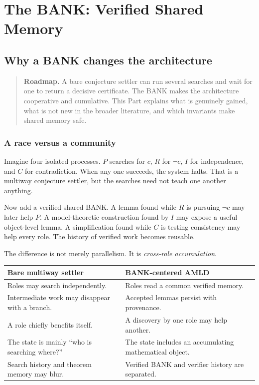 \documentclass[11pt,openany]{book}
\theoremstyle{definition}
\theoremstyle{remark}
\newenvironment{roadmap}{\begin{quote}\small\color{deepblue}\textbf{Roadmap.} }{\end{quote}}
\begin{document}
\part{The BANK: Verified Shared Memory}

\chapter{Why a BANK changes the architecture}
\begin{roadmap}
A bare conjecture settler can run several searches and wait for one to return a decisive certificate. The BANK makes the architecture cooperative and cumulative. This Part explains what is genuinely gained, what is not new in the broader literature, and which invariants make shared memory safe.
\end{roadmap}

\section{A race versus a community}
Imagine four isolated processes. $P$ searches for $c$, $R$ for $\neg c$, $I$ for independence, and $C$ for contradiction. When any one succeeds, the system halts. That is a multiway conjecture settler, but the searches need not teach one another anything.

Now add a verified shared BANK. A lemma found while $R$ is pursuing $\neg c$ may later help $P$. A model-theoretic construction found by $I$ may expose a useful object-level lemma. A simplification found while $C$ is testing consistency may help every role. The history of verified work becomes reusable.

The difference is not merely parallelism. It is \emph{cross-role accumulation}.

\begin{center}
\begin{tabular}{>{\raggedright\arraybackslash}p{}>{\raggedright\arraybackslash}p{}}
\toprule
\textbf{Bare multiway settler} & \textbf{BANK-centered AMLD}\\
\midrule
Roles may search independently. & Roles read a common verified memory.\\
Intermediate work may disappear with a branch. & Accepted lemmas persist with provenance.\\
A role chiefly benefits itself. & A discovery by one role may help another.\\
The state is mainly ``who is searching where?'' & The state includes an accumulating mathematical object.\\
Search history and theorem memory may blur. & Verified BANK and verifier history are separated.\\
\bottomrule
\end{tabular}
\end{center}
\end{document}
